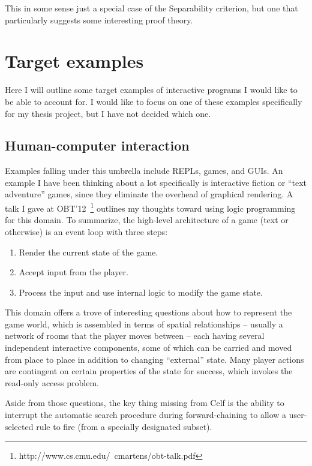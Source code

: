\documentclass{article}
\begin{document}
This in some sense just a special case of the Separability
criterion, but one that particularly suggests some interesting proof
theory.

\section{Target examples}

Here I will outline some target examples of interactive programs I would
like to be able to account for. I would like to focus on one of these
examples specifically for my thesis project, but I have not decided which
one.

\subsection{Human-computer interaction}

Examples falling under this umbrella include REPLs, games, and GUIs. An
example I have been thinking about a lot specifically is interactive
fiction or ``text adventure'' games, since they eliminate the overhead of
graphical rendering. A talk I gave at
OBT'12~\footnote{http://www.cs.cmu.edu/~cmartens/obt-talk.pdf} outlines my thoughts
toward using logic programming for this domain. To summarize, the
high-level architecture of a game (text or otherwise) is an event loop with
three steps:

\begin{enumerate}
\item Render the current state of the game.
\item Accept input from the player.
\item Process the input and use internal logic to modify the game state.
\end{enumerate}

This domain offers a trove of interesting questions about how to represent
the game world, which is assembled in terms of spatial relationships --
usually a network of rooms that the player moves between -- each having
several independent interactive components, some of which can be carried
and moved from place to place in addition to changing ``external'' state.
Many player actions are contingent on certain properties of the state for
success, which invokes the read-only access problem.

Aside from those questions, the key thing missing from Celf is the ability
to interrupt the automatic search procedure during forward-chaining to
allow a user-selected rule to fire (from a specially designated subset).
\end{document}
